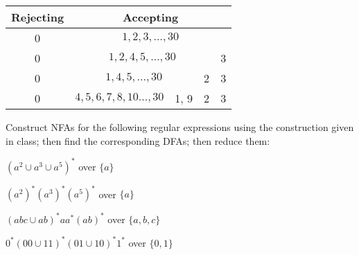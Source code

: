\begin{solution}
\begin{enumerate}[(a)]
\begin{multicols}{2}
           \begin{tabular}[t]{|c|c|c|c|c|c|c|c|c|c|c|c|c|c|c|c|c|c|c|c|c|c|c|c|c|c|c|c|c|c|c|}\hline
            \multicolumn{1}{|c|}{Rejecting} & \multicolumn{30}{|c|}{Accepting}\\\hline
            \multicolumn{1}{|c|}{0} & \multicolumn{30}{|c|}{$1,2,3,\hdots,30$}\\\hline
            \multicolumn{1}{|c|}{0} & \multicolumn{29}{|c|}{$1,2,4,5,\hdots,30$} & 3\\\hline
            \multicolumn{1}{|c|}{0} & \multicolumn{28}{|c|}{$1,4,5,\hdots,30$} & 2 & 3\\\hline
            \multicolumn{1}{|c|}{0} & \multicolumn{26}{|c|}{$4,5,6,7,8,10\hdots,30$} & \multicolumn{2}{c|}{1, 9} & 2 & 3\\\hline
            \end{tabular}
        \end{multicols}
    \end{enumerate}
\end{solution}

\begin{exercise}{3}
Construct NFAs for the following regular expressions using the construction given in class; then find the corresponding DFAs; then reduce them:
\begin{enumerate}[(a)]
\begin{multicols}{2}
    \item $(a^2 \cup a^3 \cup a^5)^*$ over $\{a\}$
    \item $(a^2)^*(a^3)^*(a^5)^*$ over $\{a\}$
    \item $(abc \cup ab)^*aa^*(ab)^*$ over $\{a, b, c\}$
    \item $0^*(00\cup11)^*(01\cup10)^*1^*$ over $\{0, 1\}$
\end{multicols}
\end{enumerate}
\end{exercise}

